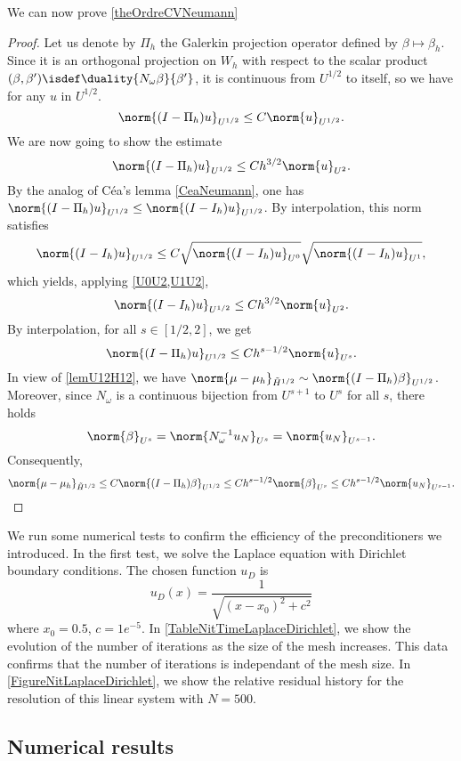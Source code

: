 \documentclass[a4paper]{article}
\begin{document}
	\noindent We can now prove \autoref{theOrdreCVNeumann}
	\begin{proof}
		Let us denote by $\Pi_h$ the Galerkin projection operator defined by $\beta \mapsto \beta_h$. Since it is an orthogonal projection on $W_h$ with respect to the scalar product $(\beta,\beta') \isdef \duality{N_\omega \beta}{\beta'}$, it is continuous from $U^{1/2}$ to itself, so we have for any $u$ in $U^{1/2}$. 
		\[\norm{(I - \Pi_h)u}_{U^{1/2}} \leq C \norm{u}_{U^{1/2}}.\]
		We are now going to show the estimate
		\[\norm{(I - \Pi_h)u}_{U^{1/2}} \leq C h^{3/2} \norm{u}_{U^{2}}.\]
		By the analog of Céa's lemma \autoref{CeaNeumann}, one has $\norm{(I-\Pi_h)u}_{U^{1/2}} \leq \norm{(I - I_h) u}_{U^{1/2}}$. By interpolation, this norm satisfies
		\[\norm{(I - I_h)u}_{U^{1/2}} \leq C \sqrt{\norm{(I - I_h)u}_{U^{0}}}\sqrt{\norm{(I - I_h)u}_{U^{1}}},\]
		which yields, applying \autoref{U0U2,U1U2},
		\[\norm{(I - I_h)u}_{U^{1/2}} \leq C h^{3/2} \norm{u}_{U^2}.\]
		By interpolation, for all $s \in [1/2,2]$, we get
		\[\norm{(I - \Pi_h)u}_{U^{1/2}} \leq C h^{s - 1/2} \norm{u}_{U^s}.\]
		In view of \autoref{lemU12H12}, we have $\norm{\mu - \mu_h}_{\tilde{H}^{1/2}} \sim \norm{(I - \Pi_h)\beta}_{U^{1/2}}$. Moreover, since $N_\omega$ is a continuous bijection from $U^{s+1}$ to $U^s$ for all $s$, there holds
		\[\norm{\beta}_{U^s} = \norm{N_\omega^{-1} u_N}_{U^s} = \norm{u_N}_{U^{s-1}}.\]
		Consequently, 
		\[\norm{\mu - \mu_h}_{\tilde{H}^{1/2}} \leq  C\norm{(I - \Pi_h)\beta}_{U^{1/2}} \leq C h^{s - 1/2} \norm{\beta}_{U^s} \leq C h^{s - 1/2} \norm{u_N}_{U^{s-1}}.\]
	\end{proof}
	
	
	We run some numerical tests to confirm the efficiency of the preconditioners we introduced. In the first test, we solve the Laplace equation with Dirichlet boundary conditions. The chosen function $u_D$ is
	\[u_D(x) = \frac{1}{\sqrt{(x - x_0)^2 + c^2}}\]  
	where $x_0 = 0.5$, $c = 1e^{-5}$. In \autoref{TableNitTimeLaplaceDirichlet}, we show the evolution of the number of iterations as the size of the mesh increases. This data confirms that the number of iterations is independant of the mesh size. In \autoref{FigureNitLaplaceDirichlet}, we show the relative residual history for the resolution of this linear system with $N = 500$. 
	
	

	
	
	\subsection{Numerical results}
	
\end{document}
